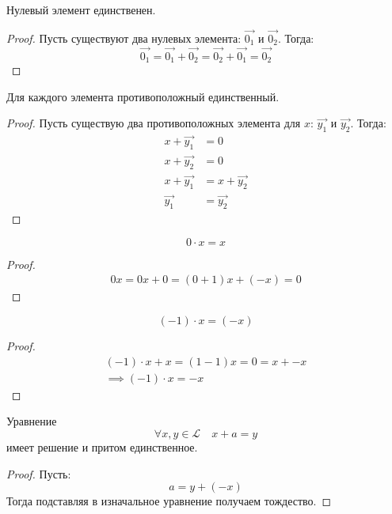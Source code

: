 \begin{property}
    Нулевый элемент единственен.
\end{property}
\begin{proof}
    Пусть существуют два нулевых элемента: $\vec{0_1}$ и $\vec{0_2}$. Тогда: \[
        \vec{0_1} = \vec{0_1} + \vec{0_2} = \vec{0_2} + \vec{0_1} = \vec{0_2}
    \]
\end{proof}

\begin{property}
    Для каждого элемента противоположный единственный.
\end{property}
\begin{proof}
    Пусть существую два противоположных элемента для $x$: $\vec{y_1}$ и $\vec{y_2}$. Тогда:
    \begin{align*}
        x + \vec{y_1} &= 0 \\
        x + \vec{y_2} &= 0 \\
        x + \vec{y_1} &= x + \vec{y_2} \\
        \vec{y_1} &= \vec{y_2}
    \end{align*}
\end{proof}

\begin{property}
    \[
        0 \cdot x = x
    \]
\end{property}
\begin{proof}
    \begin{gather*}
        0 x = 0 x + 0 = (0 + 1) x + (-x) = 0
    \end{gather*} 
\end{proof}

\begin{property}
    \[
        (-1) \cdot x = (- x)
    \]
\end{property}
\begin{proof}
    \begin{gather*}
        (-1) \cdot x + x = (1 - 1) x = 0 = x + -x \\
        \implies (-1) \cdot x = -x
    \end{gather*}
\end{proof}

\begin{property}
    Уравнение \[
        \forall x, y \in \mathcal{L} \quad x + a = y
    \]
    имеет решение и притом единственное.
\end{property}
\begin{proof}
    Пусть: \[
        a = y + (-x)
    \]
    Тогда подставляя в изначальное уравнение получаем тождество.
\end{proof}

